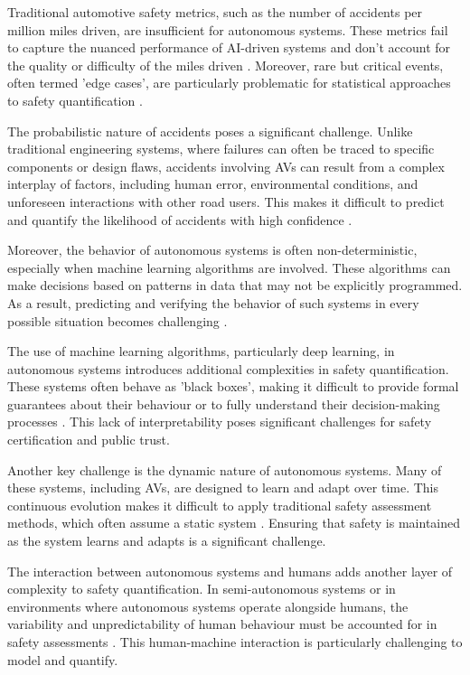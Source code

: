 Traditional automotive safety metrics, such as the number of accidents per million miles driven, are insufficient for autonomous systems. These metrics fail to capture the nuanced performance of AI-driven systems and don't account for the quality or difficulty of the miles driven \cite{Kalra2016}. Moreover, rare but critical events, often termed 'edge cases', are particularly problematic for statistical approaches to safety quantification \cite{Koopman2019}.

The probabilistic nature of accidents poses a significant challenge. Unlike traditional engineering systems, where failures can often be traced to specific components or design flaws, accidents involving AVs can result from a complex interplay of factors, including human error, environmental conditions, and unforeseen interactions with other road users. This makes it difficult to predict and quantify the likelihood of accidents with high confidence \cite{Zhao2020}.

Moreover, the behavior of autonomous systems is often non-deterministic, especially when machine learning algorithms are involved. These algorithms can make decisions based on patterns in data that may not be explicitly programmed. As a result, predicting and verifying the behavior of such systems in every possible situation becomes challenging \cite{Amodei2016}.

The use of machine learning algorithms, particularly deep learning, in autonomous systems introduces additional complexities in safety quantification. These systems often behave as 'black boxes', making it difficult to provide formal guarantees about their behaviour or to fully understand their decision-making processes \cite{Burton2017}. This lack of interpretability poses significant challenges for safety certification and public trust.

Another key challenge is the dynamic nature of autonomous systems. Many of these systems, including AVs, are designed to learn and adapt over time. This continuous evolution makes it difficult to apply traditional safety assessment methods, which often assume a static system \cite{Salay2019}. Ensuring that safety is maintained as the system learns and adapts is a significant challenge.

The interaction between autonomous systems and humans adds another layer of complexity to safety quantification. In semi-autonomous systems or in environments where autonomous systems operate alongside humans, the variability and unpredictability of human behaviour must be accounted for in safety assessments \cite{Endsley2017}. This human-machine interaction is particularly challenging to model and quantify.

